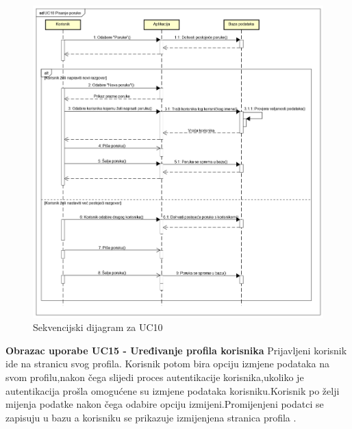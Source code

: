 				\begin{figure}[H]
					\begin{center}
						\includegraphics[width=15cm]{slike/UC10.PNG}
					\end{center}
					\caption{Sekvencijski dijagram za UC10}
					\label{fig:uc10}
				\end{figure}
				
				\eject
				 \textbf{Obrazac uporabe UC15 - Uređivanje profila korisnika}
			\newline
			{Prijavljeni korisnik ide na stranicu svog profila.
			Korisnik potom bira opciju izmjene podataka na svom profilu,nakon čega slijedi proces autentikacije korisnika,ukoliko je autentikacija prošla omogućene su izmjene podataka korisniku.Korisnik po želji mijenja podatke nakon čega odabire opciju izmijeni.Promijenjeni podatci se zapisuju u bazu a korisniku se prikazuje izmijenjena stranica profila .}\\
				
